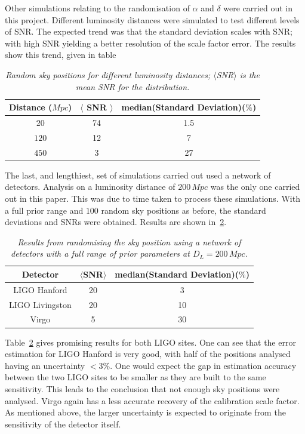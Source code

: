 \documentclass{jpconf}
\begin{document}
Other simulations relating to the randomisation of $\alpha$ and $\delta$ were carried out in this project. Different luminosity distances were simulated to test different levels of SNR. The expected trend was that the standard deviation scales with SNR; with high SNR yielding a better resolution of the scale factor error. The results show this trend, given in table 

\begin{table}[H]
  \centering
  \begin{tabular}{|c|c|c|}
    \hline
    Distance ($Mpc$) &$\langle$ SNR $\rangle$ & median(Standard Deviation)($\%$) \\
    \hline 
    $20$ & 74 & 1.5 \\
    $120$ & 12  & 7 \\
    $450$ & 3 & 27\\
    \hline
  \end{tabular}
  \caption{\textit{Random sky positions for different luminosity distances; $\langle$SNR$\rangle$ is the mean SNR for the distribution. }}
  \label{tab:dist-randsp}
\end{table}

The last, and lengthiest, set of simulations carried out used a network of detectors. Analysis on a luminosity distance of $200 \,Mpc$ was the only one carried out in this paper. This was due to time taken to process these simulations. With a full prior range and $100$ random sky positions as before, the standard deviations and SNRs were obtained. Results are shown in~\ref{tab:mult-rndsp}.


\begin{table}[H]
\centering
\begin{tabular}[H]{|c|c|c|}
\hline
  Detector   & $\langle$SNR$\rangle$ & median(Standard Deviation)($\%$)\\
\hline
LIGO Hanford & 20& 3 \\
LIGO Livingston & 20 & 10 \\
Virgo & 5 & 30\\
\hline
\end{tabular}
\caption{\textit{Results from randomising the sky position using a network of detectors with a full range of prior parameters at $D_{L} = 200\, Mpc$.}}
\label{tab:mult-rndsp}
\end{table}


Table~\ref{tab:mult-rndsp} gives promising results for both LIGO sites. One can see that the error estimation for LIGO Hanford is very good, with half of the positions analysed having an uncertainty $<3\%$. One would expect the gap in estimation accuracy between the two LIGO sites to be smaller as they are built to the same sensitivity. This leads to the conclusion that not enough sky positions were analysed. Virgo again has a less accurate recovery of the calibration scale factor. As mentioned above, the larger uncertainty is expected to originate from the sensitivity of the detector itself.  
\end{document}
